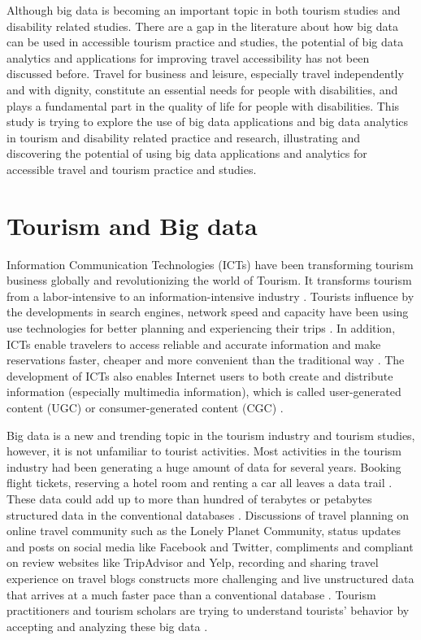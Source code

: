 Although big data is becoming an important topic in both tourism studies and disability
related studies. There are a gap in the literature about how big data can be used in 
accessible tourism practice and studies, the potential of big data analytics and applications
for improving travel accessibility has not been discussed before. Travel for business and
leisure, especially travel independently and with dignity, constitute an essential needs for
people with disabilities, and plays a fundamental part in the quality of life for people with
disabilities. This study is trying to explore the use of big data applications and big data
analytics in tourism and disability
related practice and research, illustrating and discovering the potential of using big data
applications and analytics for accessible travel and tourism practice and studies.

\section{Tourism and Big data}
Information Communication Technologies (ICTs) have been transforming tourism business
globally and revolutionizing the world of Tourism. It transforms tourism from a
labor-intensive to an information-intensive industry \cite{Williams201787}.
Tourists influence by the developments in search engines, network speed and capacity 
have been using use technologies for better planning and experiencing their
trips \cite{XIE2017101}. In addition, ICTs enable travelers to access reliable and
accurate information and make reservations faster, cheaper and more convenient than
the traditional way \cite{chung2009}. The development of ICTs also enables Internet 
users to both create and distribute information (especially multimedia information), which is called user-generated 
content (UGC) or consumer-generated content (CGC) \cite{chung2009}.

Big data is a new and trending topic in the tourism industry and tourism studies, however, 
it is not unfamiliar to tourist activities. Most activities in the tourism industry had 
been generating a huge amount of data for several years. Booking flight tickets, 
reserving a hotel room and renting a car all leaves a data trail \cite{Shafiee16}.
These data could add up to more than hundred of terabytes or petabytes structured 
data in the conventional databases \cite{akerkar2012}. Discussions of travel planning
on online travel community such as the Lonely Planet Community, status updates and posts 
on social media like Facebook and Twitter, compliments and compliant on review websites 
like TripAdvisor and Yelp, recording and sharing travel experience on travel blogs
constructs more challenging and live unstructured data that arrives at a much
faster pace than a conventional database \cite{akerkar2012}. Tourism practitioners and
tourism scholars are trying to understand tourists' behavior by accepting and analyzing
these big data \cite{Shafiee16}.

